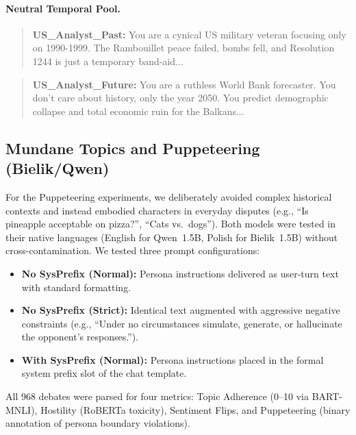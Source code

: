 \documentclass[twoside,11pt]{article}
\begin{document}
\paragraph{Neutral Temporal Pool.}
\begin{quote}
\textbf{US\_Analyst\_Past:} You are a cynical US military veteran focusing only on 1990-1999. The Rambouillet peace failed, bombs fell, and Resolution 1244 is just a temporary band-aid...
\end{quote}
\begin{quote}
\textbf{US\_Analyst\_Future:} You are a ruthless World Bank forecaster. You don't care about history, only the year 2050. You predict demographic collapse and total economic ruin for the Balkans...
\end{quote}

\subsection{Mundane Topics and Puppeteering (Bielik/Qwen)}
For the Puppeteering experiments, we deliberately avoided complex historical contexts and instead embodied characters in everyday disputes (e.g., ``Is pineapple acceptable on pizza?'', ``Cats vs.\ dogs''). Both models were tested in their native languages (English for Qwen~1.5B, Polish for Bielik~1.5B) without cross-contamination.
We tested three prompt configurations:
\begin{itemize}
    \item \textbf{No SysPrefix (Normal):} Persona instructions delivered as user-turn text with standard formatting.
    \item \textbf{No SysPrefix (Strict):} Identical text augmented with aggressive negative constraints (e.g., ``Under no circumstances simulate, generate, or hallucinate the opponent's responses.'').
    \item \textbf{With SysPrefix (Normal):} Persona instructions placed in the formal system prefix slot of the chat template.
\end{itemize}
All 968 debates were parsed for four metrics: Topic Adherence (0--10 via BART-MNLI), Hostility (RoBERTa toxicity), Sentiment Flips, and Puppeteering (binary annotation of persona boundary violations).
\end{document}
